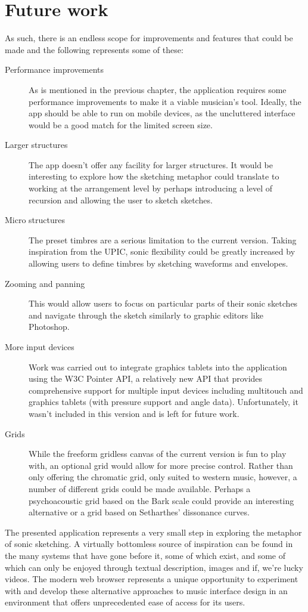 \documentclass[12pt]{report}
\begin{document}
\chapter{Future work}
\label{sec:orgedab749}
As such, there is an endless scope for improvements and features that could be
made and the following represents some of these:

\begin{description}
\item[{Performance improvements}] As is mentioned in the previous chapter, the
application requires some performance improvements to make it a viable
musician's tool. Ideally, the app should be able to run on mobile devices,
as the uncluttered interface would be a good match for the limited screen
size.
\item[{Larger structures}] The app doesn't offer any facility for larger structures.
It would be interesting to explore how the sketching metaphor could
translate to working at the arrangement level by perhaps introducing a
level of recursion and allowing the user to sketch sketches.
\item[{Micro structures}] The preset timbres are a serious limitation to the current
version. Taking inspiration from the UPIC, sonic flexibility could be
greatly increased by allowing users to define timbres by sketching
waveforms and envelopes.
\item[{Zooming and panning}] This would allow users to focus on particular parts of
their sonic sketches and navigate through the sketch similarly to graphic
editors like Photoshop.
\item[{More input devices}] Work was carried out to integrate graphics tablets into
the application using the W3C Pointer API, a relatively new API that
provides comprehensive support for multiple input devices including
multitouch and graphics tablets (with pressure support and angle data).
Unfortunately, it wasn't included in this version and is left for future
work.
\item[{Grids}] While the freeform gridless canvas of the current version is fun to
play with, an optional grid would allow for more precise control.
Rather than only offering the chromatic grid, only suited to western
music, however, a number of different grids could be made available.
Perhaps a psychoacoustic grid based on the Bark scale could provide
an interesting alternative or a grid based on Setharthes' dissonance
curves.
\end{description}

The presented application represents a very small step in exploring the metaphor
of sonic sketching. A virtually bottomless source of inspiration can be found in
the many systems that have gone before it, some of which exist, and some of
which can only be enjoyed through textual description, images and if, we're
lucky videos. The modern web browser represents a unique opportunity to
experiment with and develop these alternative approaches to music interface
design in an environment that offers unprecedented ease of access for its users.
\end{document}

